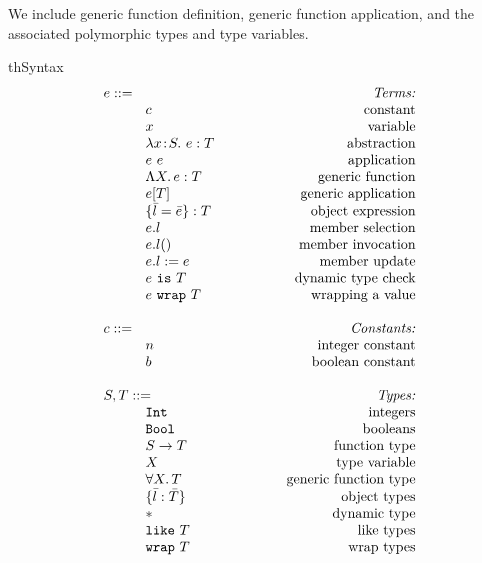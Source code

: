 \documentclass{article}
\newcommand{\mkrefl}[3]{\t{ref}^{#3}~{#1}~#2}
\newcommand{\derefl}[2]{!^{#2}{#1}}
\newcommand{\assignl}[3]{{#1}:=^{#3}{#2}}
\newcommand{\Ref}[1]{\t{Ref}~{#1}}
\newcommand{\lam}[4]{\lambda#1\!:\!#2.\,\,#4:#3}
\newcommand{\lamt}[2]{#1\rightarrow #2}
\newcommand{\app}[2]{#1~#2}
\newcommand{\Int}{\t{Int}}
\newcommand{\Bool}{\t{Bool}}
\newcommand{\dynamic}{\t{*}}
\newcommand{\true}{\t{true}}
\newcommand{\false}{\t{false}}
\newcommand{\Lam}[3]{\Lambda #1.\,#2:#3}
\newcommand{\App}[2]{#1[#2]}
\newcommand{\Lamt}[2]{\forall #1.\,#2}
\newcommand{\lett}[4]{\t{letXXX}~{#1}:{#2}={#3}~\t{in}~{#4}}
\newcommand{\cast}[2]{#1~\t{is}~#2}
\renewcommand{\t}[1]{{\tt #1}}
\newcommand{\objty}[1]{\{#1\}}
\newcommand{\obje}[2]{\{#1\}:{#2}}
\newcommand{\objget}[2]{#1.#2}
\newcommand{\objcall}[2]{#1.#2()}
\newcommand{\objset}[3]{#1.#2:=#3}
\newcommand{\wrapty}[1]{\t{wrap}~#1}
\newcommand{\likety}[1]{\t{like}~#1}
\newcommand{\wrap}[2]{#1~\t{wrap}~#2}
\begin{document}
We include generic function definition, generic function application, and the associated polymorphic types and type variables.



\begin{displayfigure}{th}{\label{fig:syntax}Syntax}
\[
\begin{array}{llr}
	\mydefhead{e ::=\qquad\qquad\qquad\qquad\qquad}{Terms:} 
	\mydefcase{c								}{constant} 
	\mydefcase{x								}{variable} 
	\mydefcase{\lam{x}{S}{T}{e} 				}{abstraction} 
	\mydefcase{\app{e}{e} 					}{application} 
	\mydefcase{\Lam{X}{e}{T}					}{generic function}
	\mydefcase{\App{e}{T}					}{generic application}
	\mydefcase{\obje{\bar{l}=\bar{e}}{T}		}{object expression}
	\mydefcase{\objget{e}{l}					}{member selection}
	\mydefcase{\objcall{e}{l}				}{member invocation}
	\mydefcase{\objset{e}{l}{e}				}{member update}
	\mydefcase{\cast{e}{T}					}{dynamic type check}
	\mydefcase{\wrap{e}{T}					}{wrapping a value}
\\
	\mydefhead{c ::=}{Constants:} 
	\mydefcase{n								}{integer constant} 
	\mydefcase{b								}{boolean constant} 
\\
	\mydefhead{S,T::=}{Types:} 
	\mydefcase{\Int 							}{integers}
	\mydefcase{\Bool							}{booleans}
	\mydefcase{\lamt{S}{T} 					}{function type}
	\mydefcase{X								}{type variable}
	\mydefcase{\Lamt{X}{T}					}{generic function type}
	\mydefcase{\objty{\bar{l}:\bar{T}}	   	}{object types}
	\mydefcase{\dynamic 		    				}{dynamic type}
	\mydefcase{\likety{T}					}{like types}
	\mydefcase{\wrapty{T}					}{wrap types}
\end{array}
\]
\end{displayfigure}
\end{document}
